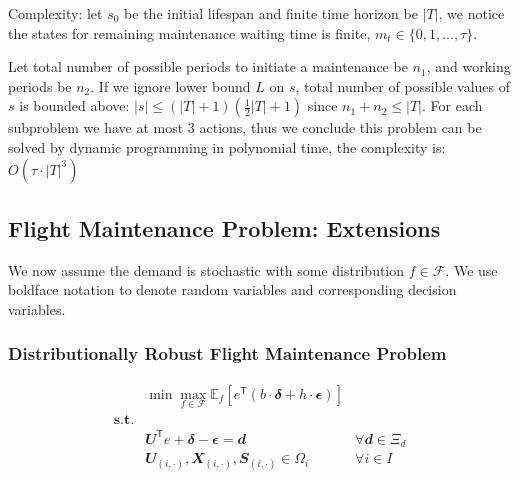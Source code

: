 \documentclass[../main]{subfiles}
\begin{document}
Complexity: let \(s_0\) be the initial lifespan and finite time horizon
be \(|T|\), we notice the states for remaining maintenance waiting time
is finite, \(m_t \in \{0, 1, ..., \tau\}\).

Let total number of possible periods to initiate a maintenance be
\(n_1\), and working periods be \(n_2\). If we ignore lower bound \(L\)
on \(s\), total number of possible values of \(s\) is bounded above:
\(|s| \le (|T| + 1)(\frac{1}{2}|T| + 1)\)
since \(n_1 + n_2 \le |T|\). For each subproblem we have at most 3
actions, thus we conclude this problem can be solved by dynamic
programming in polynomial time, the complexity is:
\(O\left(\tau\cdot|T|^3 \right)\)





\subsection{Flight Maintenance Problem: Extensions}\label{sec.sfmp}


We now assume the demand is stochastic with some distribution \(f\in \mathscr F\).
We use boldface notation to denote random variables and corresponding
decision variables.

\subsubsection{Distributionally Robust Flight Maintenance Problem}\label{sec.lro_fmp}


\[\begin{aligned}
                  & \min \max_{f\in \mathscr F}\mathbb E_f  \left[e^\mathsf{T}( b \cdot\mathbfit{\delta}  + h\cdot \mathbfit\epsilon)\right]                                 \\
    \mathbf{s.t.} &                                                                                                                                                          \\
                  & \mathbfit{U} ^\mathsf{T} e + \mathbfit \delta - \mathbfit\epsilon  = \mathbfit d                                         & \forall \mathbfit d \in \Xi_d \\
                  & \mathbfit U_{(i,\cdot)}, \mathbfit X_{(i,\cdot)}, \mathbfit S_{(i,\cdot)} \in \Omega_i                                   & \forall i\in I
  \end{aligned}\]
\end{document}
